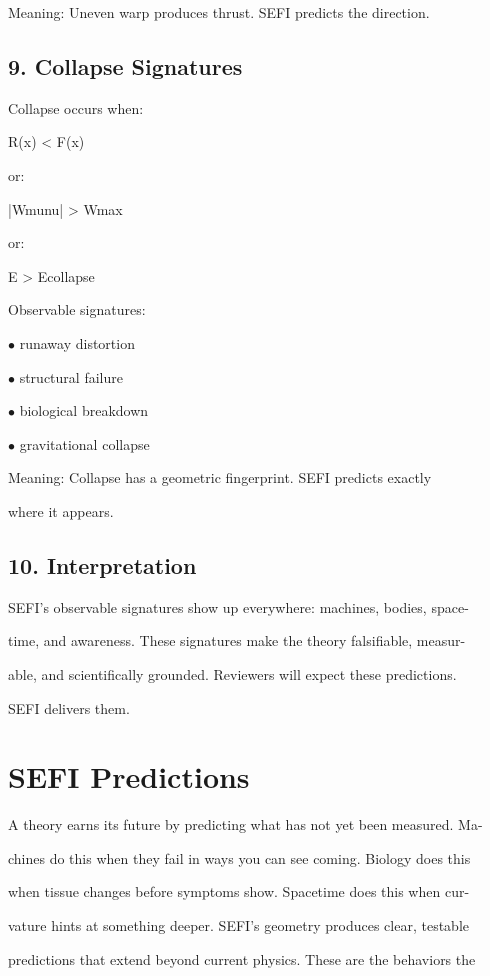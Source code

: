 \documentclass[10pt]{article}
\begin{document}
Meaning: Uneven warp produces thrust. SEFI predicts the direction.

\subsection*{9. Collapse Signatures}
Collapse occurs when:

R(x) < F(x)

or:

|Wmunu| > Wmax

or:

E > Ecollapse

Observable signatures:

\noindent $\bullet$ runaway distortion


\noindent $\bullet$ structural failure

\noindent $\bullet$ biological breakdown

\noindent $\bullet$ gravitational collapse

Meaning: Collapse has a geometric fingerprint. SEFI predicts exactly

where it appears.

\subsection*{10. Interpretation}
SEFI's observable signatures show up everywhere: machines, bodies, space-

time, and awareness. These signatures make the theory falsifiable, measur-

able, and scientifically grounded. Reviewers will expect these predictions.

SEFI delivers them.

\section*{SEFI Predictions}
A theory earns its future by predicting what has not yet been measured. Ma-

chines do this when they fail in ways you can see coming. Biology does this

when tissue changes before symptoms show. Spacetime does this when cur-

vature hints at something deeper. SEFI's geometry produces clear, testable

predictions that extend beyond current physics. These are the behaviors the
\end{document}
